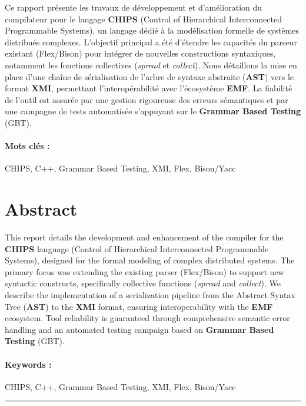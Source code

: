 \documentclass[a4paper, 11pt]{article}
\begin{document}
    Ce rapport présente les travaux de développement et d'amélioration du compilateur pour le langage \textbf{CHIPS} (Control of Hierarchical Interconnected Programmable Systems), un langage dédié à la modélisation formelle de systèmes distribués complexes. L'objectif principal a été d'étendre les capacités du parseur existant (Flex/Bison) pour intégrer de nouvelles constructions syntaxiques, notamment les fonctions collectives (\textit{spread} et \textit{collect}). Nous détaillons la mise en place d'une chaîne de sérialisation de l'arbre de syntaxe abstraite (\textbf{AST}) vers le format \textbf{XMI}, permettant l'interopérabilité avec l'écosystème \textbf{EMF}. La fiabilité de l'outil est assurée par une gestion rigoureuse des erreurs sémantiques et par une campagne de tests automatisée s'appuyant sur le \textbf{Grammar Based Testing} (GBT).
    
    \paragraph{\textbf{Mots clés :}} CHIPS, C++, Grammar Based Testing, XMI, Flex, Bison/Yacc

    \vspace{1cm}

    \section*{Abstract}
    This report details the development and enhancement of the compiler for the \textbf{CHIPS} language (Control of Hierarchical Interconnected Programmable Systems), designed for the formal modeling of complex distributed systems. The primary focus was extending the existing parser (Flex/Bison) to support new syntactic constructs, specifically collective functions (\textit{spread} and \textit{collect}). We describe the implementation of a serialization pipeline from the Abstract Syntax Tree (\textbf{AST}) to the \textbf{XMI} format, ensuring interoperability with the \textbf{EMF} ecosystem. Tool reliability is guaranteed through comprehensive semantic error handling and an automated testing campaign based on \textbf{Grammar Based Testing} (GBT).
    
    \paragraph{\textbf{Keywords :}} CHIPS, C++, Grammar Based Testing, XMI, Flex, Bison/Yacc
    
    
    \vspace{0.2cm}
    \rule{\textwidth}{0.5pt}
\end{document}
